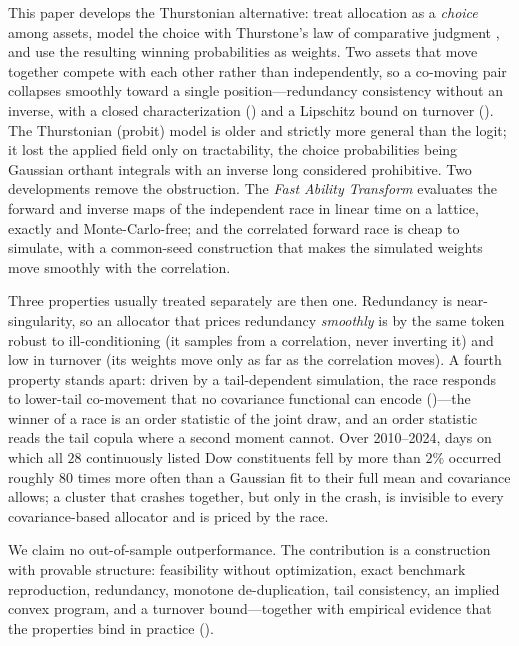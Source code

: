 \documentclass[11pt]{article}
\begin{document}
This paper develops the Thurstonian alternative: treat allocation as a
\emph{choice} among assets, model the choice with Thurstone's law of
comparative judgment \parencite{thurstone1927}, and use the resulting winning
probabilities as weights. Two assets that move together compete with each
other rather than independently, so a co-moving pair collapses smoothly toward
a single position---redundancy consistency without an inverse, with a closed
characterization () and a Lipschitz bound
on turnover (). The Thurstonian (probit) model is older and
strictly more general than the logit; it lost the applied field only on
tractability, the choice probabilities being Gaussian orthant integrals with
an inverse long considered prohibitive. Two developments remove the
obstruction. The \emph{Fast Ability Transform} \parencite{cotton2021}
evaluates the forward and inverse maps of the independent race in linear time
on a lattice, exactly and Monte-Carlo-free; and the correlated forward race is
cheap to simulate, with a common-seed construction that makes the simulated
weights move smoothly with the correlation.

Three properties usually treated separately are then one. Redundancy is
near-singularity, so an allocator that prices redundancy \emph{smoothly} is by
the same token robust to ill-conditioning (it samples from a correlation, never
inverting it) and low in turnover (its weights move only as far as the
correlation moves). A fourth property stands apart: driven by a tail-dependent
simulation, the race responds to lower-tail co-movement that no covariance
functional can encode ()---the winner of a race is an order
statistic of the joint draw, and an order statistic reads the tail copula
where a second moment cannot. Over 2010--2024, days on which all $28$
continuously listed Dow constituents fell by more than $2\%$ occurred roughly
$80$ times more often than a Gaussian fit to their full mean and covariance
allows; a cluster that crashes together, but only in the crash, is invisible
to every covariance-based allocator and is priced by the race.

We claim no out-of-sample outperformance. The contribution is a construction
with provable structure: feasibility without optimization, exact benchmark
reproduction, redundancy, monotone de-duplication, tail consistency, an
implied convex program, and a turnover bound---together with empirical
evidence that the properties bind in practice ().
\end{document}
